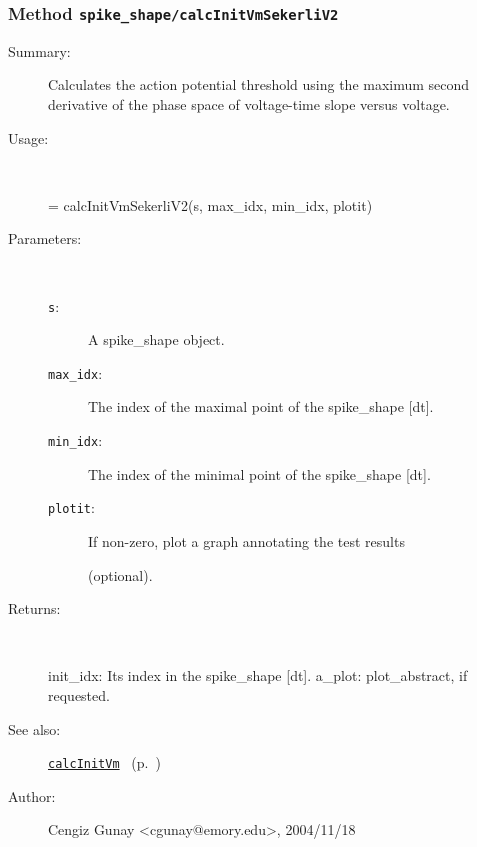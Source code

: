 \subsubsection[Method \texttt{calcInitVmSekerliV2}]{Method \texttt{spike\_shape/calcInitVmSekerliV2}}%
%
\label{ref_spike_shape__calcInitVmSekerliV2}%
\hypertarget{ref_spike_shape__calcInitVmSekerliV2}{}%
\begin{description}
\item[Summary:]Calculates the action potential threshold using the maximum second derivative of the phase space of voltage-time slope versus voltage.
%
\item[Usage:]~%
\begin{lyxcode}%
[init\_idx, a\_plot] = calcInitVmSekerliV2(s, max\_idx, min\_idx, plotit)
%
\end{lyxcode}%
%
%
\item[Parameters:]~
\begin{description}%
\item[\texttt{s}:]
 A spike\_shape object.
\item[\texttt{max\_idx}:]
 The index of the maximal point of the spike\_shape [dt].
\item[\texttt{min\_idx}:]
 The index of the minimal point of the spike\_shape [dt].
\item[\texttt{plotit}:]
 If non-zero, plot a graph annotating the test results 

(optional).
\end{description}%
%
\item[Returns:
]~

	init\_idx: Its index in the spike\_shape [dt].
	a\_plot: plot\_abstract, if requested.
%
%
\item[See also:]%
\hyperlink{ref_calcInitVm}{\texttt{calcInitVm}}%
\ (p.~\pageref{ref_calcInitVm})%
%
%
\item[Author:]%
Cengiz Gunay <cgunay@emory.edu>, 2004/11/18
%
\end{description}
\methodline%
